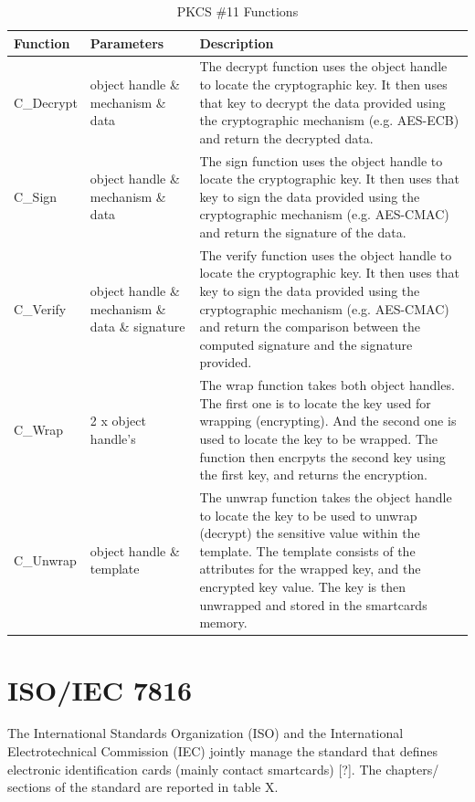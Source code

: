 \documentclass[bsc,frontabs,twoside,singlespacing,parskip,deptreport]{infthesis}     %
\begin{document}
\begin{table}[H]
\begin{tabular}{|l|p{5cm}|p{8cm}|}
\hline
Function & Parameters & Description\\
\hline
C\_Decrypt & object handle \& mechanism \& data & The decrypt function uses the object handle to locate the cryptographic key. It then uses that key to decrypt the data provided using the cryptographic mechanism (e.g. AES-ECB) and return the decrypted data. \\
\hline
C\_Sign & object handle \& mechanism \& data & The sign function uses the object handle to locate the cryptographic key. It then uses that key to sign the data provided using the cryptographic mechanism (e.g. AES-CMAC) and return the signature of the data. \\
\hline
C\_Verify & object handle \& mechanism \& data \& signature & The verify function uses the object handle to locate the cryptographic key. It then uses that key to sign the data provided using the cryptographic mechanism (e.g. AES-CMAC) and return the comparison between the computed signature and the signature provided. \\
\hline
C\_Wrap & 2 x object handle's &  The wrap function takes both object handles. The first one is to locate the key used for wrapping (encrypting). And the second one is used to locate the key to be wrapped. The function then encrpyts the second key using the first key, and returns the encryption. \\
\hline
C\_Unwrap & object handle \& template & The unwrap function takes the object handle to locate the key to be used to unwrap (decrypt) the sensitive value within the template. The template consists of the attributes for the wrapped key, and the encrypted key value. The key is then unwrapped and stored in the smartcards memory. \\
\hline
\end{tabular}
\caption{PKCS \#11 Functions}
\end{table}

\section{ISO/IEC 7816}

The International Standards Organization (ISO) and the International Electrotechnical Commission (IEC) jointly manage the standard that defines electronic identification cards (mainly contact smartcards) [?].
The chapters/ sections of the standard are reported in table X. 
 
\end{document}
